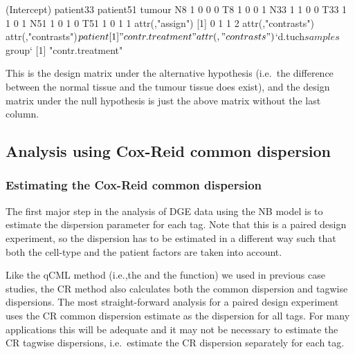 \begin{Schunk}
\begin{Soutput}
    (Intercept) patient33 patient51 tumour
N8            1         0         0      0
T8            1         0         0      1
N33           1         1         0      0
T33           1         1         0      1
N51           1         0         1      0
T51           1         0         1      1
attr(,"assign")
[1] 0 1 1 2
attr(,"contrasts")
attr(,"contrasts")$patient
[1] "contr.treatment"

attr(,"contrasts")$`d.tuch$samples$group`
[1] "contr.treatment"
\end{Soutput}
\end{Schunk}

This is the design matrix under the alternative hypothesis (i.e.~the
difference between the normal tissue and the tumour tissue does
exist), and the design matrix under the null hypothesis is just the
above matrix without the last column.


\subsection{Analysis using Cox-Reid common dispersion}

\subsubsection{Estimating the Cox-Reid common dispersion}

The first major step in the analysis of DGE data using the NB model is
to estimate the dispersion parameter for each tag. Note that this is a
paired design experiment, so the dispersion has to be estimated in a
different way such that both the cell-type and the patient factors are
taken into account.

Like the qCML method (i.e.,the  and the
 function) we used in previous case
studies, the CR method also calculates both the common dispersion and
tagwise dispersions. The most straight-forward analysis for a paired
design experiment uses the CR common dispersion estimate as the
dispersion for all tags. For many applications this will be adequate
and it may not be necessary to estimate the CR tagwise dispersions,
i.e.~estimate the CR dispersion separately for each tag.

